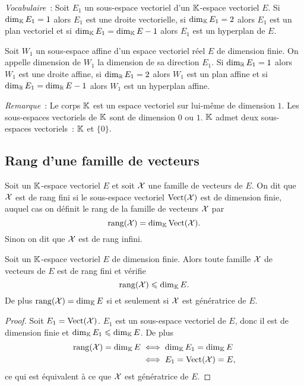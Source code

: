 \emph{Vocabulaire}~: Soit \(E_1\) un sous-espace vectoriel d'un \(\mathbb{K}\)-espace 
vectoriel \(E\). Si \(\operatorname{dim}_{\mathbb{K}} E_1=1\) alors \(E_1\) est une droite vectorielle, 
si \(\operatorname{dim}_{\mathbb{K}} E_1=2\) alors \(E_1\) est un plan vectoriel et si \(\operatorname{dim}_{\mathbb{K}} E_1 = 
\operatorname{dim}_{\mathbb{K}} E -1\) alors \(E_1\) est un hyperplan de \(E\).

\begin{defdef}
  Soit \(W_1\) un sous-espace affine d'un espace vectoriel réel \(E\) de 
  dimension finie. On appelle dimension de \(W_1\) la dimension de sa direction 
  \(E_1\). Si \(\operatorname{dim}_{\mathbb{R}} E_1=1\) alors \(W_1\) est une droite affine, si 
  \(\operatorname{dim}_{\mathbb{R}} E_1=2\) alors \(W_1\) est un plan affine et si \(\operatorname{dim}_{\mathbb{R}} E_1=\operatorname{dim}_{\mathbb{R}} 
  E -1 \) alors \(W_1\) est un hyperplan affine.
\end{defdef}

\emph{Remarque}~: Le corps \(\mathbb{K}\) est un espace vectoriel sur lui-même de 
dimension \(1\). Les sous-espaces vectoriels de \(\mathbb{K}\) sont de dimension \(0\) 
ou \(1\). \(\mathbb{K}\) admet deux sous-espaces vectoriels~: \(\mathbb{K}\) et \(\{0\}\).

\subsection{Rang d'une famille de vecteurs}

\begin{defdef}
  Soit un \(\mathbb{K}\)-espace vectoriel \(E\) et soit \(\mathcal{X}\) une famille de vecteurs 
  de \(E\). On dit que \(\mathcal{X}\) est de rang fini si le sous-espace vectoriel 
  \(\operatorname{Vect}(\mathcal{X})\) est de dimension finie, auquel cas on définit le rang de 
  la famille de vecteurs \(\mathcal{X}\) par
  \begin{equation}
    \operatorname{rang}(\mathcal{X})=\operatorname{dim}_{\mathbb{K}} \operatorname{Vect}(\mathcal{X}).
  \end{equation}
  Sinon on dit que \(\mathcal{X}\) est de rang infini.
\end{defdef}

\begin{prop}
  Soit un \(\mathbb{K}\)-espace vectoriel \(E\) de dimension finie. Alors toute famille 
  \(\mathcal{X}\) de vecteurs de \(E\) est de rang fini et vérifie
  \begin{equation}
    \operatorname{rang}(\mathcal{X}) \leqslant \operatorname{dim}_{\mathbb{K}} E.
  \end{equation}
  De plus \(\operatorname{rang}(\mathcal{X}) = \operatorname{dim}_{\mathbb{K}} E\) si et seulement si \(\mathcal{X}\) est génératrice de 
  \(E\).
\end{prop}
\begin{proof}
  Soit \(E_1=\operatorname{Vect}(\mathcal{X})\). \(E_1\) est un sous-espace vectoriel de \(E\), 
  donc il est de dimension finie et \(\operatorname{dim}_{\mathbb{K}} E_1 \leqslant \operatorname{dim}_{\mathbb{K}} E\). De plus
  \begin{align}
    \operatorname{rang}(\mathcal{X}) = \operatorname{dim}_{\mathbb{K}} E &\iff \operatorname{dim}_{\mathbb{K}} E_1 = \operatorname{dim}_{\mathbb{K}} E\\
    & \iff E_1=\operatorname{Vect}(\mathcal{X})=E,
  \end{align}
  ce qui est équivalent à ce que \(\mathcal{X}\) est génératrice de \(E\).
\end{proof}

